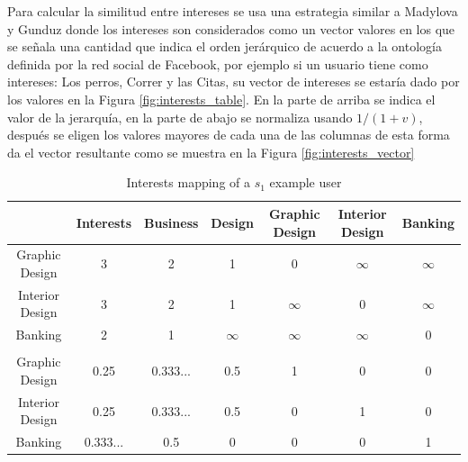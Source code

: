 Para calcular la similitud entre intereses se usa una estrategia similar a Madylova y Gunduz \cite{taxonomy_semantic_similarity} donde los intereses son considerados como un vector valores en los que se señala una cantidad que indica el orden jerárquico de acuerdo a la ontología definida por la red social de Facebook, por ejemplo si un usuario tiene como intereses: Los perros, Correr y las Citas, su vector de intereses se estaría dado por los valores en la Figura \ref{fig:interests_table}. En la parte de arriba se indica el valor de la jerarquía, en la parte de abajo se normaliza usando $1/(1+v)$, después se eligen los valores mayores de cada una de las columnas de esta forma da el vector resultante como se muestra en la Figura \ref{fig:interests_vector} \\

\begin{table}[]
\caption{Interests mapping of a $s_1$ example user}
\label{tab:interests_s_1}
\centering
\begin{tabular}{|c|c|c|c|c|c|c|}
\hline
                & Interests & Business & Design   & Graphic Design & Interior Design & Banking  \\ \hline
Graphic Design  & 3         & 2                     & 1        & 0              & $\infty$        & $\infty$ \\ \hline
Interior Design & 3         & 2                     & 1        & $\infty$       & 0               & $\infty$ \\ \hline
Banking         & 2         & 1                     & $\infty$ & $\infty$       & $\infty$        & 0        \\ \hline
                &           &                       &          &                &                 &          \\ \hline 
Graphic Design  & 0.25      & 0.333...              & 0.5      & 1              & 0               & 0        \\ \hline
Interior Design & 0.25      & 0.333...              & 0.5      & 0              & 1               & 0        \\ \hline
Banking         & 0.333...  & 0.5                   & 0        & 0              & 0               & 1        \\ \hline
\end{tabular}
\end{table}


